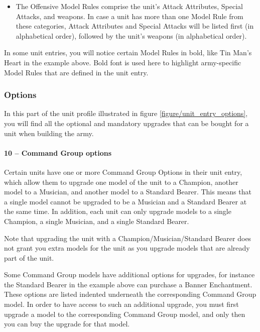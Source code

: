 \columnbreak

\begin{itemize}
	\item The Offensive Model Rules comprise the unit's Attack Attributes, Special Attacks, and weapons. In case a unit has more than one Model Rule from these categories, Attack Attributes and Special Attacks will be listed first (in alphabetical order), followed by the unit's weapons (in alphabetical order).
\end{itemize}

In some unit entries, you will notice certain Model Rules in bold, like Tin Man's Heart in the example above. Bold font is used here to highlight army-specific Model Rules that are defined in the unit entry.

\subsubsection{Options}

In this part of the unit profile illustrated in figure \ref{figure/unit_entry_options}, you will find all the optional and mandatory upgrades that can be bought for a unit when building the army.

\paragraph{10 -- Command Group options}

Certain units have one or more Command Group Options in their unit entry, which allow them to upgrade one model of the unit to a Champion, another model to a Musician, and another model to a Standard Bearer. This means that a single \rnf{} model cannot be upgraded to be a Musician and a Standard Bearer at the same time. In addition, each unit can only upgrade models to a single Champion, a single Musician, and a single Standard Bearer.

Note that upgrading the unit with a Champion/Musician/Standard Bearer does not grant you extra models for the unit as you upgrade models that are already part of the unit.

Some Command Group models have additional options for upgrades, for instance the Standard Bearer in the example above can purchase a Banner Enchantment. These options are listed indented underneath the corresponding Command Group model. In order to have access to such an additional upgrade, you must first upgrade a model to the corresponding Command Group model, and only then you can buy the upgrade for that model.

